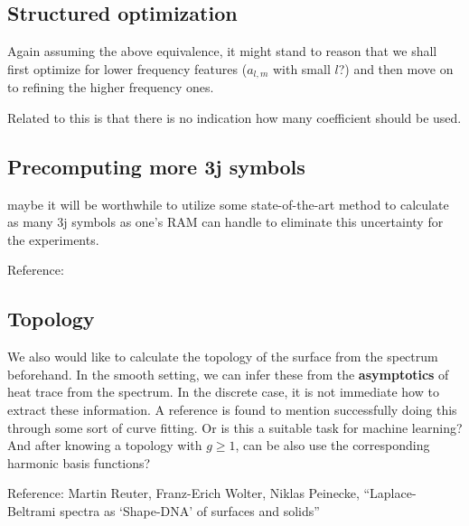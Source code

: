 \documentclass[11pt]{article}
\theoremstyle{definition}
\begin{document}

\subsection{Structured optimization}
Again assuming the above equivalence, it might stand to reason that we shall first optimize for lower frequency features ($a_{l,m}$ with small $l$?) and then move on to refining the higher frequency ones.

Related to this is that there is no indication how many coefficient should be used.

\subsection{Precomputing more 3j symbols}
maybe it will be worthwhile to utilize some state-of-the-art method to calculate as many 3j symbols as one's RAM can handle to eliminate this uncertainty for the experiments.

Reference: 

\subsection{Topology}
We also would like to calculate the topology of the surface from the spectrum beforehand. In the smooth setting, we can infer these from the \textbf{asymptotics} of heat trace from the spectrum. In the discrete case, it is not immediate how to extract these information. A reference is found to mention successfully doing this through some sort of curve fitting. Or is this a suitable task for machine learning? And after knowing a topology with $g\geq1$, can be also use the corresponding harmonic basis functions?

Reference: Martin Reuter, Franz-Erich Wolter, Niklas Peinecke, ``Laplace-Beltrami spectra as `Shape-DNA' of surfaces and solids''
\end{document}
